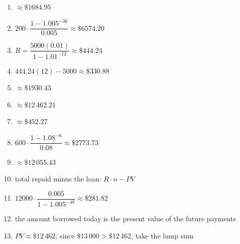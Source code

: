 \documentclass[11pt]{article}
\begin{document}
\begin{keybox}
\begin{multicols}{2}
\small
\begin{enumerate}[leftmargin=*,itemsep=3pt]
  \item $\approx\$1684.95$
  \item $200\cdot\dfrac{1-1.005^{-36}}{0.005}\approx\$6574.20$
  \item $R=\dfrac{5000(0.01)}{1-1.01^{-12}}\approx\$444.24$
  \item $444.24(12)-5000\approx\$330.88$
  \item $\approx\$1930.43$
  \item $\approx\$12\,462.21$
  \item $\approx\$452.27$
  \item $600\cdot\dfrac{1-1.08^{-6}}{0.08}\approx\$2773.73$
  \item $\approx\$12\,055.43$
  \item total repaid minus the loan: $R\cdot n-PV$
  \item $12000\cdot\dfrac{0.005}{1-1.005^{-48}}\approx\$281.82$
  \item the amount borrowed today is the present value of the future payments
  \item $PV\approx\$12\,462$; since $\$13\,000>\$12\,462$, take the lump sum
\end{enumerate}
\end{multicols}
\end{keybox}
\end{document}
